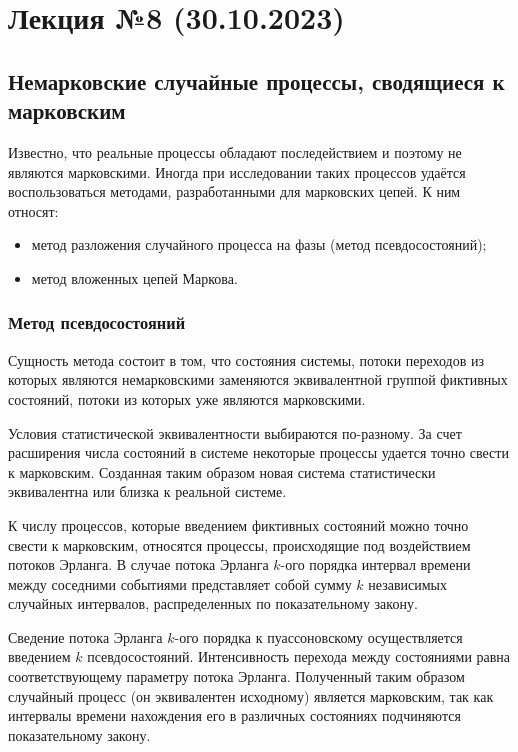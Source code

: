 \section{Лекция №8 (30.10.2023)}

\subsection{Немарковские случайные процессы, сводящиеся к марковским}

Известно, что реальные процессы обладают последействием и поэтому не являются марковскими. Иногда при исследовании таких процессов удаётся воспользоваться методами, разработанными для марковских цепей. К ним относят:

\begin{itemize}
    \item метод разложения случайного процесса на фазы (метод псевдосостояний);
    \item метод вложенных цепей Маркова.
\end{itemize}

\subsubsection{Метод псевдосостояний}

Сущность метода состоит в том, что состояния системы, потоки переходов из которых являются немарковскими заменяются эквивалентной группой фиктивных состояний, потоки из которых уже являются марковскими.

Условия статистической эквивалентности выбираются по-разному. За счет расширения числа состояний в системе некоторые процессы удается точно свести к марковским. Созданная таким образом новая система статистически эквивалентна или близка к реальной системе.

К числу процессов, которые введением фиктивных состояний можно точно свести к марковским, относятся процессы, происходящие под воздействием потоков Эрланга. В случае потока Эрланга $k$-ого порядка интервал времени между соседними событиями представляет собой сумму $k$ независимых случайных интервалов, распределенных по показательному закону.

Сведение потока Эрланга $k$-ого порядка к пуассоновскому осуществляется введением $k$ псевдосостояний. Интенсивность перехода между состояниями равна соответствующему параметру потока Эрланга. Полученный таким образом случайный процесс (он эквивалентен исходному) является марковским, так как интервалы времени нахождения его в различных состояниях подчиняются показательному закону.

